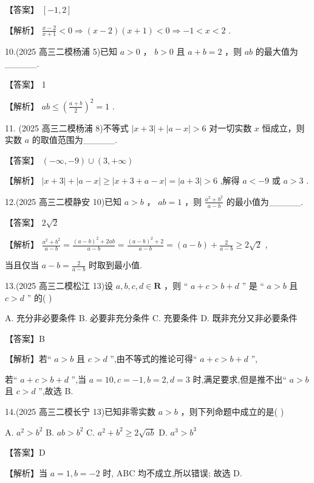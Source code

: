 \documentclass[10pt]{article}
\begin{document}
【答案】 \(\left\lbrack  {-1,2}\right\rbrack\)

【解析】 \(\frac{x - 2}{x + 1} < 0 \Rightarrow  \left( {x - 2}\right) \left( {x + 1}\right)  < 0 \Rightarrow   - 1 < x < 2\) .

10.(2025 高三二模杨浦 5)已知 \(a > 0\) ， \(b > 0\) 且 \(a + b = 2\) ，则 \({ab}\) 的最大值为\_\_\_\_\_.

【答案】 1

【解析】 \({ab} \leq  {\left( \frac{a + b}{2}\right) }^{2} = 1\) .

11. (2025 高三二模杨浦 8)不等式 \(\left| {x + 3}\right|  + \left| {a - x}\right|  > 6\) 对一切实数 \(x\) 恒成立，则实数 \(a\) 的取值范围为\_\_\_\_\_.

【答案】 \(\left( {-\infty , - 9}\right)  \cup  \left( {3, + \infty }\right)\)

【解析】 \(\left| {x + 3}\right|  + \left| {a - x}\right|  \geq  \left| {x + 3 + a - x}\right|  = \left| {a + 3}\right|  > 6\) ,解得 \(a <  - 9\) 或 \(a > 3\) .

12.(2025 高三二模静安 10)已知 \(a > b\) ， \({ab} = 1\) ，则 \(\frac{{a}^{2} + {b}^{2}}{a - b}\) 的最小值为\_\_\_\_\_.

【答案】 \(2\sqrt{2}\)

【解析】 \(\frac{{a}^{2} + {b}^{2}}{a - b} = \frac{{\left( a - b\right) }^{2} + {2ab}}{a - b} = \frac{{\left( a - b\right) }^{2} + 2}{a - b} = \left( {a - b}\right)  + \frac{2}{a - b} \geq  2\sqrt{2}\) ,

当且仅当 \(a - b = \frac{2}{a - b}\) 时取到最小值.

13.(2025 高三二模松江 13)设 \(a,b,c,d \in  \mathbf{R}\) ，则 “ \(a + c > b + d\) ” 是 “ \(a > b\) 且 \(c > d\) ” 的( )

A. 充分非必要条件 B. 必要非充分条件 C. 充要条件 D. 既非充分又非必要条件

【答案】B

【解析】若“ \(a > b\) 且 \(c > d\) ”,由不等式的推论可得“ \(a + c > b + d\) ”,

若“ \(a + c > b + d\) ”,当 \(a = {10},c =  - 1,b = 2,d = 3\) 时,满足要求,但是推不出“ \(a > b\) 且 \(c > d\) ”,故选 B.

14.(2025 高三二模长宁 13)已知非零实数 \(a > b\) ，则下列命题中成立的是( )

A. \({a}^{2} > {b}^{2}\) B. \({ab} > {b}^{2}\) C. \({a}^{2} + {b}^{2} \geq  2\sqrt{ab}\) D. \({a}^{3} > {b}^{3}\)

【答案】D

【解析】当 \(a = 1,b =  - 2\) 时, ABC 均不成立,所以错误; 故选 D.
\end{document}
